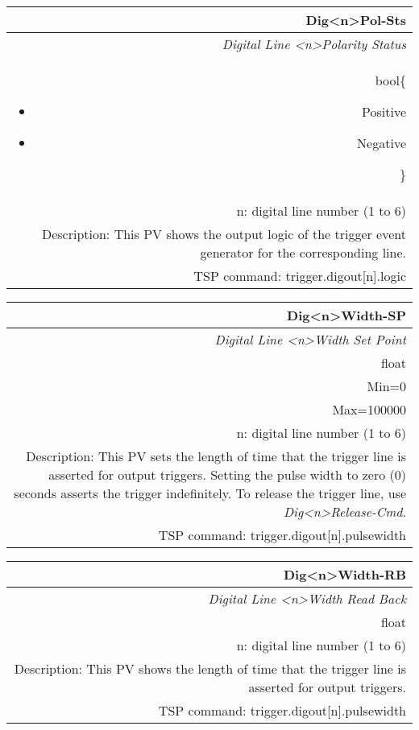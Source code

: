\documentclass[openany]{article}
\begin{document}
		\begin{tabular}{N}
			\hline
			\bfseries Dig{\textless n\textgreater}Pol-Sts\label{pv:digpol-sts} \\ \hline
			\emph{Digital Line \textless n\textgreater Polarity Status} \\
			bool\{\begin{itemize}[noitemsep]
				\small
				\item[] Positive
				\item[] Negative
			\end{itemize}\} \\
			n: digital line number (1 to 6) \\
			Description: This PV shows the output logic of the trigger event generator for the corresponding line. \\
			TSP command: trigger.digout[n].logic
		\end{tabular}

		\begin{tabular}{N}
			\hline
			\bfseries Dig{\textless n\textgreater}Width-SP\label{pv:digwidth-sp} \\ \hline
			\emph{Digital Line \textless n\textgreater Width Set Point} \\
			float \\
			Min=0 \\
			Max=100000 \\
			n: digital line number (1 to 6) \\
			Description: This PV sets the length of time that the trigger line is asserted for output triggers. Setting the pulse width to zero (0) seconds asserts the trigger indefinitely. To release the trigger line, use \emph{Dig{\textless n\textgreater}Release-Cmd}. \\
			TSP command: trigger.digout[n].pulsewidth
		\end{tabular}

		\begin{tabular}{N}
			\hline
			\bfseries Dig{\textless n\textgreater}Width-RB\label{pv:digwidth-rb} \\ \hline
			\emph{Digital Line \textless n\textgreater Width Read Back} \\
			float \\
			n: digital line number (1 to 6) \\
			Description: This PV shows the length of time that the trigger line is asserted for output triggers. \\
			TSP command: trigger.digout[n].pulsewidth
		\end{tabular}
\end{document}
